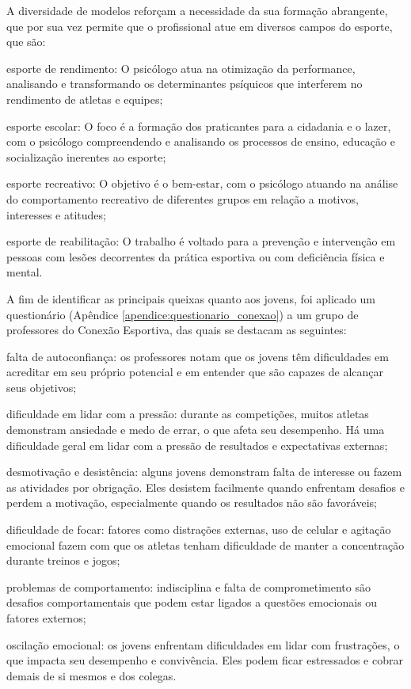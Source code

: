 \begin{Desenvolvimento}
A diversidade de modelos reforçam a necessidade da sua formação abrangente, que por sua vez permite que o profissional atue em diversos campos do esporte, que são:
\begin{alinea}
  \item esporte de rendimento: O psicólogo atua na otimização da performance, analisando e transformando os determinantes psíquicos que interferem no rendimento de atletas e equipes;
  \item esporte escolar: O foco é a formação dos praticantes para a cidadania e o lazer, com o psicólogo compreendendo e analisando os processos de ensino, educação e socialização inerentes ao esporte;
  \item esporte recreativo: O objetivo é o bem-estar, com o psicólogo atuando na análise do comportamento recreativo de diferentes grupos em relação a motivos, interesses e atitudes;
  \item esporte de reabilitação: O trabalho é voltado para a prevenção e intervenção em pessoas com lesões decorrentes da prática esportiva ou com deficiência física e mental.
\end{alinea}

A fim de identificar as principais queixas quanto aos jovens, foi aplicado um questionário (Apêndice \ref{apendice:questionario_conexao}) a um grupo de professores do Conexão Esportiva, das quais se destacam as seguintes:
\begin{alinea}
  \item falta de autoconfiança: os professores notam que os jovens têm dificuldades em acreditar em seu próprio potencial e em entender que são capazes de alcançar seus objetivos;
  \item dificuldade em lidar com a pressão: durante as competições, muitos atletas demonstram ansiedade e medo de errar, o que afeta seu desempenho. Há uma dificuldade geral em lidar com a pressão de resultados e expectativas externas;
  \item desmotivação e desistência: alguns jovens demonstram falta de interesse ou fazem as atividades por obrigação. Eles desistem facilmente quando enfrentam desafios e perdem a motivação, especialmente quando os resultados não são favoráveis;
  \item dificuldade de focar: fatores como distrações externas, uso de celular e agitação emocional fazem com que os atletas tenham dificuldade de manter a concentração durante treinos e jogos;
  \item problemas de comportamento: indisciplina e falta de comprometimento são desafios comportamentais que podem estar ligados a questões emocionais ou fatores externos;
  \item oscilação emocional: os jovens enfrentam dificuldades em lidar com frustrações, o que impacta seu desempenho e convivência. Eles podem ficar estressados e cobrar demais de si mesmos e dos colegas.
\end{alinea}


\end{Desenvolvimento}
